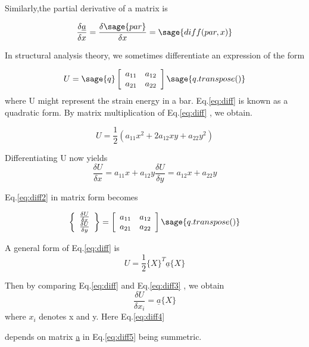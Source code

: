 \documentclass[12pt]{report}
\newcommand{\eref}[1]{
	Eq.\ref{#1}
}
\begin{document}
Similarly,the partial derivative of a matrix is 

\begin{equation} 
	\frac{\delta\underline{a}}{\delta x}= \frac{\delta \sage{par} 
    }{\delta x} = \sage{diff(par,x)} 
\end{equation}

In structural analysis theory, 
we sometimes differentiate an expression of the form 

\begin{equation}
	U =\sage{q}\left[\begin{array}{rr}a_{11} & a_{12}\\
	a_{21} & a_{22}\\ 
	\end{array}\right]\sage{q.transpose()}
\label{eq:diff}
\end{equation}
where U might represent the strain energy in 
a bar.\eref{eq:diff} is known as a quadratic 
form. By matrix multiplication of \eref{eq:diff}, 
we obtain.

\begin{equation} 
	U = \frac{1}{2}(a_{{11}}x^2 +2a_{{12}}xy + a_{{22}}y^2)
\end{equation}

Differentiating U now yields 
\begin{equation} 
	\frac{\delta U}{\delta x} = a_{{11}}x + a_{{12}}y  
	\frac{\delta U}{\delta y} = a_{{12}}x + a_{{22}}y 
	\label{eq:diff2}
\end{equation} 
\eref{eq:diff2} in matrix form becomes

\begin{equation}
	\left\{\begin{array}{rr} \frac{\delta U}{\delta x} \\
	\frac{\delta U}{\delta y} \\ 
	\end{array}\right\} = \left[\begin{array}{rr}a_{11} & a_{12} \\
	a_{21} & a_{22}\\ 
	\end{array}\right] \sage{q.transpose()}\label{eq:diff3}
\end{equation}

A general form of \eref{eq:diff} is 
\begin{equation} 
	U = \frac{1}{2}\{X\}^T\underline{a}\{X\}
	\label{eq:diff5}
\end{equation}

Then by comparing \eref{eq:diff} and \eref{eq:diff3}, we obtain 
\begin{equation}
	\frac{ \delta U}{\delta x_{i}} = \underline{a}\{X\}
	\label{eq:diff4}
\end{equation}
where $x_{i}$ denotes x and y. Here \eref{eq:diff4} 
depends on matrix \underline{a} in \eref{eq:diff5}being summetric.
\end{document}
